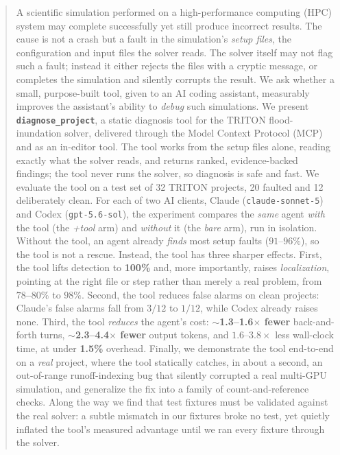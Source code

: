 \documentclass[conference]{IEEEtran}
\begin{document}
\begin{abstract}
A scientific simulation performed on a high-performance computing (HPC) system may complete
successfully yet still produce incorrect results. The cause is not a crash but a fault in the
simulation's \emph{setup files}, the configuration and input files the solver reads. The solver
itself may not flag such a fault; instead it either rejects the files with a cryptic message, or
completes the simulation and silently corrupts the result. We ask whether a small,
purpose-built tool, given to an AI coding assistant, measurably improves the assistant's ability
to \emph{debug} such simulations. We present \textbf{\texttt{diagnose\_project}}, a static diagnosis
tool for the TRITON flood-inundation solver, delivered through the Model Context Protocol (MCP)
and as an in-editor tool. The tool works from the setup files alone, reading exactly what the
solver reads, and returns ranked, evidence-backed findings; the tool never runs the solver, so
diagnosis is safe and fast. We evaluate the tool on a test set of 32 TRITON projects, 20 faulted
and 12 deliberately clean. For each of two AI clients, Claude (\texttt{claude-sonnet-5}) and
Codex (\texttt{gpt-5.6-sol}), the experiment compares the \emph{same} agent \emph{with} the tool
(the \emph{+tool} arm) and \emph{without} it (the \emph{bare} arm), run in isolation. Without the tool,
an agent already \emph{finds} most setup faults ($91$--$96\%$), so the tool is not a rescue. Instead,
the tool has three sharper effects. First, the tool lifts detection to \textbf{100\%} and, more
importantly, raises \emph{localization}, pointing at the right file or step rather than merely a
real problem, from \textbf{$78$--$80\%$} to \textbf{$98\%$}. Second, the tool reduces false alarms on clean
projects: Claude's false alarms fall from $3/12$ to $1/12$, while Codex
already raises none. Third, the tool \emph{reduces} the agent's cost: \textbf{$\sim$1.3--1.6$\times$ fewer}
back-and-forth turns, \textbf{$\sim$2.3--4.4$\times$ fewer} output tokens, and $1.6$--$3.8\times$
less wall-clock time, at under \textbf{1.5\%} overhead. Finally, we demonstrate the tool
end-to-end on a \emph{real} project, where the tool statically catches, in about a second, an
out-of-range runoff-indexing bug that silently corrupted a real multi-GPU simulation, and
generalize the fix into a family of count-and-reference checks.
Along the way we find that test fixtures must be validated against the real solver: a subtle
mismatch in our fixtures broke no test, yet quietly inflated the tool's measured advantage until
we ran every fixture through the solver.
\end{abstract}
\end{document}
